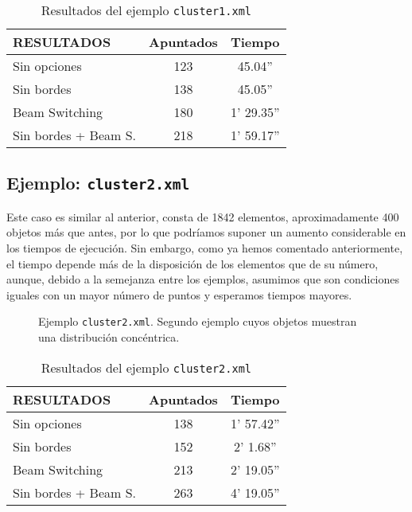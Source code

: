 \begin{table*}[!ht]
\centering
\begin{tabular}{||l||c|c||}
\hline
\hline
RESULTADOS & Apuntados & Tiempo \\
\hline
\hline
Sin opciones & 123 & 45.04'' \\
\hline
Sin bordes &138 & 45.05'' \\
\hline
Beam Switching & 180 & 1' 29.35'' \\
\hline
Sin bordes + Beam S. & 218 & 1' 59.17'' \\
\hline
\hline
\end{tabular}
\caption{Resultados del ejemplo \texttt{cluster1.xml}}
\end{table*}

\subsection {Ejemplo: \texttt{cluster2.xml}}
Este caso es similar al anterior, consta de 1842 elementos, aproximadamente 400
objetos más que antes, por lo que podríamos suponer un aumento considerable en
los tiempos de ejecución. Sin embargo, como ya hemos comentado anteriormente, el
tiempo depende más de la disposición de los elementos que de su número, aunque, 
debido a la semejanza entre los ejemplos, asumimos que son condiciones iguales
con un mayor número de puntos y esperamos tiempos mayores.

\begin{figure}[!htb]
\centering
{}
\caption{Ejemplo \texttt{cluster2.xml}. Segundo ejemplo cuyos objetos muestran una distribución concéntrica.}
\end{figure}

\begin{table*}[!ht]
\centering
\begin{tabular}{||l||c|c||}
\hline
\hline
RESULTADOS & Apuntados & Tiempo \\
\hline
\hline
Sin opciones & 138 & 1' 57.42'' \\
\hline
Sin bordes & 152& 2' 1.68'' \\
\hline
Beam Switching & 213 & 2' 19.05'' \\
\hline
Sin bordes + Beam S. & 263 & 4' 19.05'' \\
\hline
\hline
\end{tabular}
\caption{Resultados del ejemplo \texttt{cluster2.xml}}
\end{table*}

